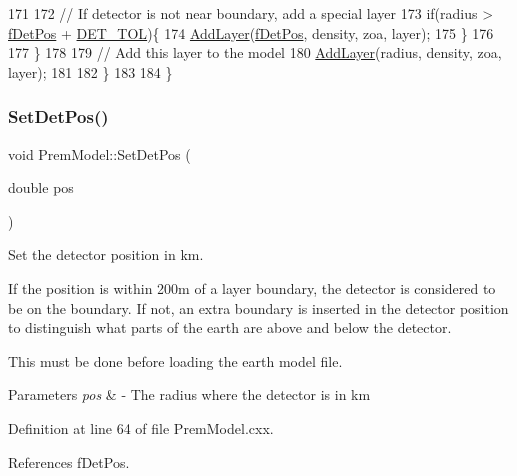 \begin{DoxyCode}
171 
172       \textcolor{comment}{// If detector is not near boundary, add a special layer}
173       \textcolor{keywordflow}{if}(radius > \hyperlink{classOscProb_1_1PremModel_ab12ea0343cd11b9233ffd20ab5e620c7}{fDetPos} + \hyperlink{classOscProb_1_1PremModel_a8ad1335ebe80ee1cd1cdf59d774ab34b}{DET\_TOL})\{
174         \hyperlink{classOscProb_1_1PremModel_a08c337b84138adc46ee4dd002e9262d2}{AddLayer}(\hyperlink{classOscProb_1_1PremModel_ab12ea0343cd11b9233ffd20ab5e620c7}{fDetPos}, density, zoa, layer);
175       \}
176 
177     \}
178 
179     \textcolor{comment}{// Add this layer to the model}
180     \hyperlink{classOscProb_1_1PremModel_a08c337b84138adc46ee4dd002e9262d2}{AddLayer}(radius, density, zoa, layer);
181 
182   \}
183 
184 \}
\end{DoxyCode}
\mbox{\label{classOscProb_1_1PremModel_a55b314e97ed9b92931e08ada0c0947eb}} 
\subsubsection{\texorpdfstring{Set\+Det\+Pos()}{SetDetPos()}}
{\footnotesize\ttfamily void Prem\+Model\+::\+Set\+Det\+Pos (\begin{DoxyParamCaption}\item[{double}]{pos }\end{DoxyParamCaption})\hspace{0.3cm}{\ttfamily [virtual]}}

Set the detector position in km.

If the position is within 200m of a layer boundary, the detector is considered to be on the boundary. If not, an extra boundary is inserted in the detector position to distinguish what parts of the earth are above and below the detector.

This must be done before loading the earth model file.


\begin{DoxyParams}{Parameters}
{\em pos} & -\/ The radius where the detector is in km \\
\hline
\end{DoxyParams}


Definition at line 64 of file Prem\+Model.\+cxx.



References f\+Det\+Pos.



